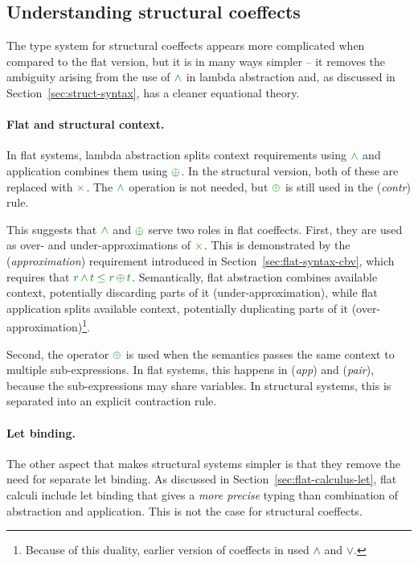 \subsection{Understanding structural coeffects}

The type system for structural coeffects appears more complicated when compared to the flat
version, but it is in many ways simpler -- it removes the ambiguity arising from the use
of $\czip$ in lambda abstraction and, as discussed in Section~\ref{sec:struct-syntax}, has
a cleaner equational theory.

\paragraph{Flat and structural context.} In flat systems, lambda abstraction splits context
requirements using $\czip$ and application combines them using $\cpar$. In the structural
version, both of these are replaced with $\atimes$. The $\czip$ operation is not needed, but
$\cpar$ is still used in the (\emph{contr}) rule.

This suggests that $\czip$ and $\cpar$ serve two roles in flat coeffects. First, they are used
as over- and under-approximations of $\atimes$. This is demonstrated by the (\emph{approximation})
requirement introduced in Section~\ref{sec:flat-syntax-cbv}, which requires that
$\cclrd{r}\,\czip\,\cclrd{t}\;\cleq\;\cclrd{r}\,\cpar\,\cclrd{t}$. Semantically, flat abstraction
combines available context, potentially discarding parts of it (under-approximation), while flat
application splits available context, potentially duplicating parts of it (over-approxi\-mation)\footnote{
Because of this duality, earlier version of coeffects in \cite{coeffects-icalp13}
used $\wedge$ and $\vee$.}.

Second, the operator $\cpar$ is used when the semantics passes the same context to multiple
sub-expressions. In flat systems, this happens in (\emph{app}) and (\emph{pair}), because the 
sub-expressions may share variables. In structural systems, this is separated into an 
explicit contraction rule.

\paragraph{Let binding.}
The other aspect that makes structural systems simpler is that they remove the need for 
separate let binding. As discussed in Section~\ref{sec:flat-calculus-let}, flat calculi include
let binding that gives a \emph{more precise} typing than combination of abstraction and 
application. This is not the case for structural coeffects.

